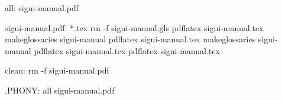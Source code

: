 all: sigui-manual.pdf

sigui-manual.pdf: *.tex
	rm -f sigui-manual.gls
	pdflatex sigui-manual.tex
	makeglossaries sigui-manual
	pdflatex sigui-manual.tex
	makeglossaries sigui-manual
	pdflatex sigui-manual.tex
	pdflatex sigui-manual.tex

clean:
	rm -f sigui-manual.pdf


.PHONY: all sigui-manual.pdf
